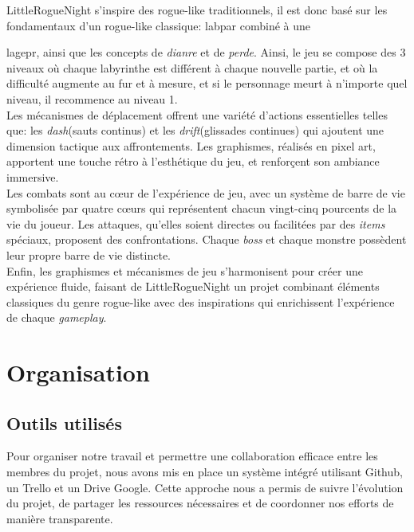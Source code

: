 \documentclass[10pt]{article}
\begin{document}
LittleRogueNight s'inspire des rogue-like traditionnels, il est donc basé sur les fondamentaux d'un rogue-like classique: \gls{labpar} combiné à une

\gls{lagepr}, ainsi que les concepts de \textit{\gls{dianre}} et de \textit{\gls{perde}}. 
Ainsi, le jeu se compose des 3 niveaux où chaque labyrinthe est différent à chaque nouvelle partie, et où la difficulté augmente au fur et à mesure, et si le personnage meurt à n'importe quel niveau, il recommence au niveau 1.\\

Les mécanismes de déplacement offrent une variété d'actions essentielles telles que: les \textit{\gls{dash}}(sauts continus) et les \textit{\gls{drift}}(glissades continues) qui ajoutent une dimension tactique aux affrontements. Les graphismes, réalisés en pixel art, apportent une touche rétro à l'esthétique du jeu, et renforçent son ambiance immersive.\\

Les combats sont au cœur de l'expérience de jeu, avec un système de barre de vie symbolisée par quatre cœurs qui représentent chacun vingt-cinq pourcents
de la vie du joueur. Les attaques, qu'elles soient directes ou facilitées par des \textit{\gls{items}} spéciaux, proposent des confrontations. Chaque \textit{\gls{boss}} et chaque monstre possèdent leur propre barre de vie distincte.\\

Enfin, les graphismes et mécanismes de jeu s'harmonisent pour créer une expérience fluide, faisant de LittleRogueNight un projet 
combinant éléments classiques du genre rogue-like avec des inspirations qui enrichissent l'expérience de chaque \textit{gameplay}.

\clearpage
\section{Organisation}   
\subsection{Outils utilisés}
Pour organiser notre travail et permettre une collaboration efficace entre les membres du projet, nous avons mis en place un système intégré utilisant \gls{Github}, un \gls{Trello} et un Drive Google. Cette approche nous a permis de suivre l'évolution du projet, de partager les ressources nécessaires et de coordonner nos efforts de manière transparente.
\end{document}
